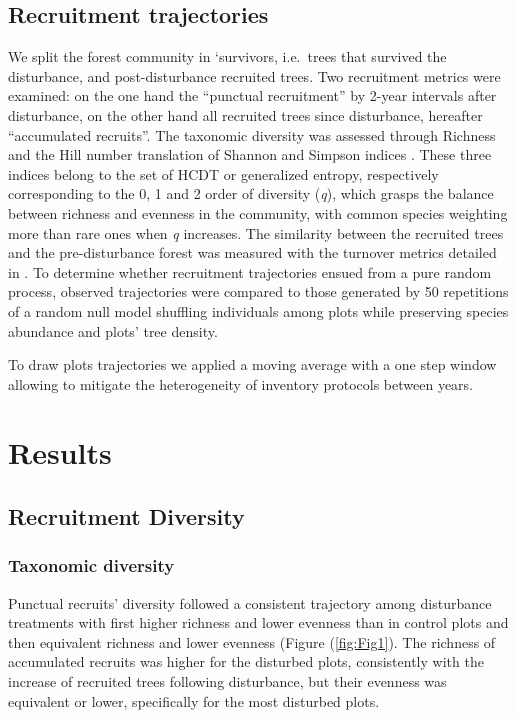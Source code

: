 \documentclass[fleqn,10pt]{ArtEcoFoG} %
\begin{document}
\subsection{Recruitment trajectories}\label{recruitment-trajectories}

We split the forest community in `survivors, i.e.~trees that survived
the disturbance, and post-disturbance recruited trees. Two recruitment
metrics were examined: on the one hand the ``punctual recruitment'' by
2-year intervals after disturbance, on the other hand all recruited
trees since disturbance, hereafter ``accumulated recruits''. The
taxonomic diversity was assessed through Richness and the Hill number
translation of Shannon and Simpson indices
\citep{Hill1973, chao2015estimating, Marcon2015b}. These three indices
belong to the set of HCDT or generalized entropy, respectively
corresponding to the 0, 1 and 2 order of diversity (\emph{q}), which
grasps the balance between richness and evenness in the community, with
common species weighting more than rare ones when \emph{q} increases.
The similarity between the recruited trees and the pre-disturbance
forest was measured with the turnover metrics detailed in
\citet{Podani2013a}. To determine whether recruitment trajectories
ensued from a pure random process, observed trajectories were compared
to those generated by 50 repetitions of a random null model shuffling
individuals among plots while preserving species abundance and plots'
tree density.

To draw plots trajectories we applied a moving average with a one step
window allowing to mitigate the heterogeneity of inventory protocols
between years.

\section{Results}\label{results}

\subsection{Recruitment Diversity}\label{recruitment-diversity}

\subsubsection{Taxonomic diversity}\label{taxonomic-diversity}

Punctual recruits' diversity followed a consistent trajectory among
disturbance treatments with first higher richness and lower evenness
than in control plots and then equivalent richness and lower evenness
(Figure (\ref{fig:Fig1}). The richness of accumulated recruits was
higher for the disturbed plots, consistently with the increase of
recruited trees following disturbance, but their evenness was equivalent
or lower, specifically for the most disturbed plots.
\end{document}
